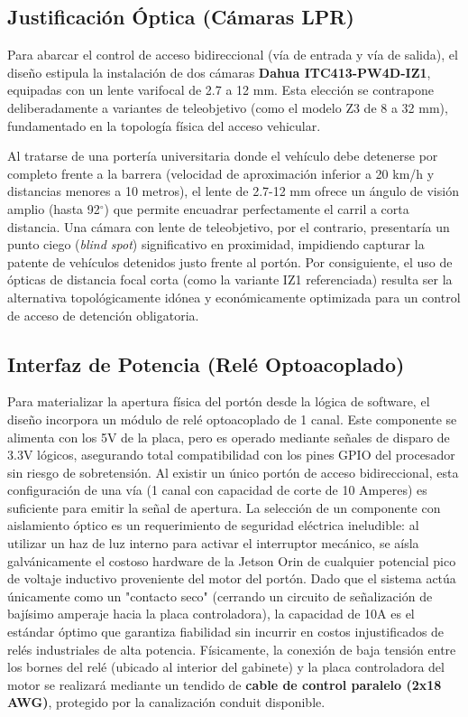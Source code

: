 \subsection{Justificación Óptica (Cámaras LPR)}

Para abarcar el control de acceso bidireccional (vía de entrada y vía de salida), el diseño estipula la instalación de dos cámaras \textbf{Dahua ITC413-PW4D-IZ1}, equipadas con un lente varifocal de 2.7 a 12 mm. Esta elección se contrapone deliberadamente a variantes de teleobjetivo (como el modelo Z3 de 8 a 32 mm), fundamentado en la topología física del acceso vehicular. 

Al tratarse de una portería universitaria donde el vehículo debe detenerse por completo frente a la barrera (velocidad de aproximación inferior a 20 km/h y distancias menores a 10 metros), el lente de 2.7-12 mm ofrece un ángulo de visión amplio (hasta 92$^\circ$) que permite encuadrar perfectamente el carril a corta distancia. Una cámara con lente de teleobjetivo, por el contrario, presentaría un punto ciego (\textit{blind spot}) significativo en proximidad, impidiendo capturar la patente de vehículos detenidos justo frente al portón. Por consiguiente, el uso de ópticas de distancia focal corta (como la variante IZ1 referenciada) resulta ser la alternativa topológicamente idónea y económicamente optimizada para un control de acceso de detención obligatoria.

\subsection{Interfaz de Potencia (Relé Optoacoplado)}

Para materializar la apertura física del portón desde la lógica de software, el diseño incorpora un módulo de relé optoacoplado de 1 canal. Este componente se alimenta con los 5V de la placa, pero es operado mediante señales de disparo de 3.3V lógicos, asegurando total compatibilidad con los pines GPIO del procesador sin riesgo de sobretensión. Al existir un único portón de acceso bidireccional, esta configuración de una vía (1 canal con capacidad de corte de 10 Amperes) es suficiente para emitir la señal de apertura. La selección de un componente con aislamiento óptico es un requerimiento de seguridad eléctrica ineludible: al utilizar un haz de luz interno para activar el interruptor mecánico, se aísla galvánicamente el costoso hardware de la Jetson Orin de cualquier potencial pico de voltaje inductivo proveniente del motor del portón. Dado que el sistema actúa únicamente como un "contacto seco" (cerrando un circuito de señalización de bajísimo amperaje hacia la placa controladora), la capacidad de 10A es el estándar óptimo que garantiza fiabilidad sin incurrir en costos injustificados de relés industriales de alta potencia. Físicamente, la conexión de baja tensión entre los bornes del relé (ubicado al interior del gabinete) y la placa controladora del motor se realizará mediante un tendido de \textbf{cable de control paralelo (2x18 AWG)}, protegido por la canalización conduit disponible.

